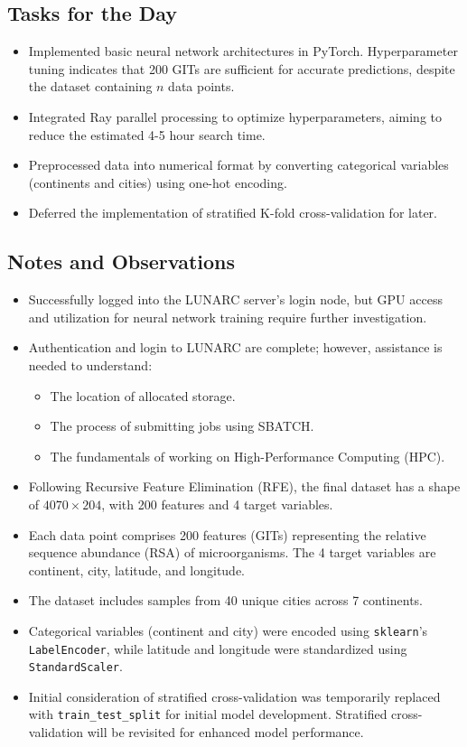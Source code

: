\documentclass{article}
\begin{document}
\subsection*{Tasks for the Day}
\begin{itemize}
    \item Implemented basic neural network architectures in PyTorch. Hyperparameter tuning indicates that 200 GITs are sufficient for accurate predictions, despite the dataset containing \( n \) data points.
    \item Integrated Ray parallel processing to optimize hyperparameters, aiming to reduce the estimated 4-5 hour search time.
    \item Preprocessed data into numerical format by converting categorical variables (continents and cities) using one-hot encoding.
    \item Deferred the implementation of stratified K-fold cross-validation for later.
\end{itemize}

\subsection*{Notes and Observations}
\begin{itemize}
    \item Successfully logged into the LUNARC server's login node, but GPU access and utilization for neural network training require further investigation.
    \item Authentication and login to LUNARC are complete; however, assistance is needed to understand:
    \begin{itemize}
        \item The location of allocated storage.
        \item The process of submitting jobs using SBATCH.
        \item The fundamentals of working on High-Performance Computing (HPC).
    \end{itemize}
    \item Following Recursive Feature Elimination (RFE), the final dataset has a shape of \(4070 \times 204\), with 200 features and 4 target variables.
    \item Each data point comprises 200 features (GITs) representing the relative sequence abundance (RSA) of microorganisms. The 4 target variables are continent, city, latitude, and longitude.
    \item The dataset includes samples from 40 unique cities across 7 continents.
    \item Categorical variables (continent and city) were encoded using \texttt{sklearn}'s \texttt{LabelEncoder}, while latitude and longitude were standardized using \texttt{StandardScaler}.
    \item Initial consideration of stratified cross-validation was temporarily replaced with \texttt{train\_test\_split} for initial model development. Stratified cross-validation will be revisited for enhanced model performance.
\end{itemize}
\end{document}
